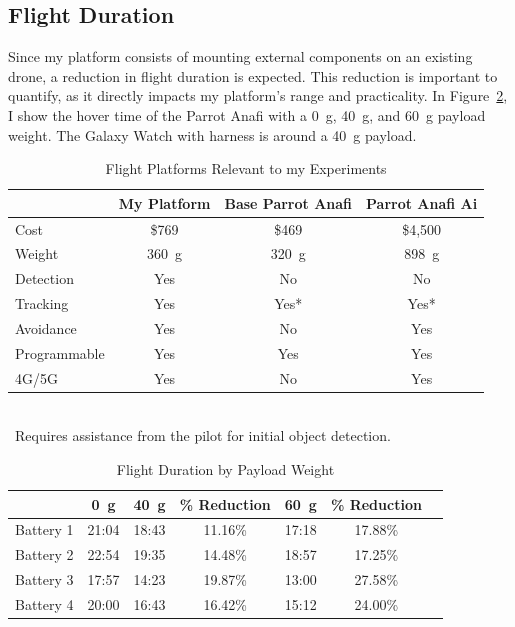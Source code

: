 \subsection{Flight Duration}
\label{sec:flightduration}

Since my platform consists of mounting external components on an
existing drone, a reduction in flight duration is expected. This
reduction is important to quantify, as it directly impacts my
platform's range and practicality. In Figure~\ref{fig:battery}, I
show the hover time of the Parrot Anafi with a 0~g, 40~g, and 60~g
payload weight. The Galaxy Watch with harness is around a 40~g
payload.

\begin{table}
	\centering
	\begin{tabular}{|l|c|c|c|}
		\hline
		& My Platform & Base Parrot Anafi & Parrot Anafi Ai \\
		\hline
		Cost & \$769 & \$469 & \$4,500 \\
		\hline
		Weight & 360~g & 320~g & 898~g \\ 
		\hline
		Detection & \cellcolor{green!30}Yes & \cellcolor{red!30}No & \cellcolor{red!30}No \\
		\hline
		Tracking & \cellcolor{green!30}Yes & \cellcolor{yellow!30}Yes* & \cellcolor{yellow!30}Yes*\\
		\hline
		Avoidance & \cellcolor{green!30}Yes & \cellcolor{red!30}No & \cellcolor{green!30}Yes\\
		\hline
		Programmable & \cellcolor{green!30}Yes & \cellcolor{green!30}Yes & \cellcolor{green!30}Yes\\
		\hline
		4G/5G & \cellcolor{green!30}Yes & \cellcolor{red!30}No & \cellcolor{green!30}Yes\\
		\hline
	\end{tabular}
	\begin{captext}
            \\[0.1cm]
		\centering
		\small *~Requires assistance from the pilot for initial object detection.
	\end{captext}
	\caption{Flight Platforms Relevant to my Experiments}
	\label{fig:featurematrix}
\end{table}

\begin{table}
\centering
\begin{tabular}{|l|c|c|c|c|c|c|}
\hline
&0~g &40~g &\cellcolor[HTML]{FF9470}\% Reduction 
 &60~g &\cellcolor[HTML]{FF9470}\% Reduction \\
 \hline
Battery 1 & 21:04 & 18:43 &11.16\% & 17:18 &17.88\% \\
 \hline
Battery 2 & 22:54 & 19:35 &14.48\% & 18:57 &17.25\% \\
 \hline
Battery 3 & 17:57 & 14:23 &19.87\% & 13:00 &27.58\% \\
 \hline
Battery 4 & 20:00 & 16:43 &16.42\% & 15:12 &24.00\% \\
 \hline
\end{tabular}
\caption{Flight Duration by Payload Weight}
\label{fig:battery}
\end{table}

